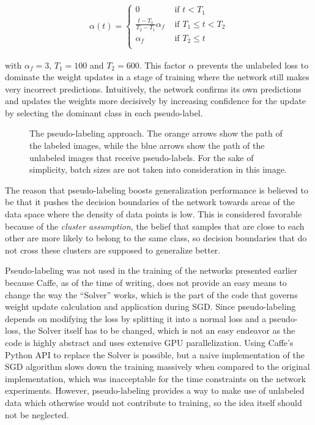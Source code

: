 \begin {align}
\alpha(t) = \begin{cases} 0 &\text{ if } t < T_1 \\
				\frac{t - T_1}{T_2 - T_1} \alpha_f &\text{ if } T_1 \leq t < T_2 \\
				\alpha_f &\text { if } T_2 \leq t \\
	        \end{cases}
\end {align}

\noindent with $\alpha_f = 3$, $T_1 = 100$ and $T_2 = 600$. This factor $\alpha$ prevents the unlabeled loss to dominate the weight updates in a stage of training where the network still makes very incorrect predictions. Intuitively, the network confirms its own predictions and updates the weights more decisively by increasing confidence for the update by selecting the dominant class in each pseudo-label.\\

\begin {figure}[!htb]
	\begin{center}
		\scalebox{0.45}{}
	\end{center}

		\caption[Pseudo-Labeling.]{The pseudo-labeling approach. The orange arrows show the path of the labeled images, while the blue arrows show the path of the unlabeled images that receive pseudo-labels. For the sake of simplicity, batch sizes are not taken into consideration in this image.}
		\label{fig:pseudo_label}
\end {figure}

The reason that pseudo-labeling boosts generalization performance is believed to be that it pushes the decision boundaries of the network towards areas of the data space where the density of data points is low. This is considered favorable because of the \textit{cluster assumption}, the belief that samples that are close to each other are more likely to belong to the same class, so decision boundaries that do not cross these clusters are supposed to generalize better. \cite{pseudo_label}

Pseudo-labeling was not used in the training of the networks presented earlier because Caffe, as of the time of writing, does not provide an easy means to change the way the ``Solver'' works, which is the part of the code that governs weight update calculation and application during SGD. Since pseudo-labeling depends on modifying the loss by splitting it into a normal loss and a pseudo-loss, the Solver itself has to be changed, which is not an easy endeavor as the code is highly abstract and uses extensive GPU parallelization. Using Caffe's Python API to replace the Solver is possible, but a naive implementation of the SGD algorithm slows down the training massively when compared to the original implementation, which was inacceptable for the time constraints on the network experiments. However, pseudo-labeling provides a way to make use of unlabeled data which otherwise would not contribute to training, so the idea itself should not be neglected.


